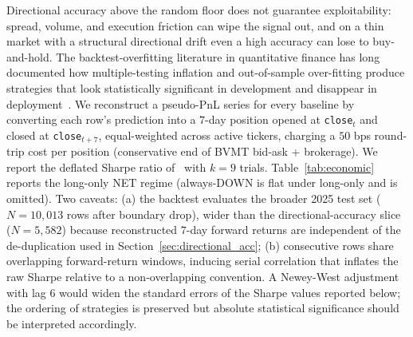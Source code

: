 \documentclass[conference]{IEEEtran}
\begin{document}
Directional accuracy above the random floor does not guarantee exploitability: spread, volume, and execution friction can wipe the signal out, and on a thin market with a structural directional drift even a high accuracy can lose to buy-and-hold. The backtest-overfitting literature in quantitative finance has long documented how multiple-testing inflation and out-of-sample over-fitting produce strategies that look statistically significant in development and disappear in deployment~\cite{ref:bailey_pseudo,ref:harvey_presidential}. We reconstruct a pseudo-PnL series for every baseline by converting each row's prediction into a $7$-day position opened at \texttt{close}$_t$ and closed at \texttt{close}$_{t+7}$, equal-weighted across active tickers, charging a $50$ bps round-trip cost per position (conservative end of BVMT bid-ask + brokerage). We report the deflated Sharpe ratio of~\cite{ref:deflated_sharpe} with $k\!=\!9$ trials. Table~\ref{tab:economic} reports the long-only NET regime (always-DOWN is flat under long-only and is omitted). Two caveats: (a) the backtest evaluates the broader 2025 test set ($N=10{,}013$ rows after boundary drop), wider than the directional-accuracy slice ($N=5{,}582$) because reconstructed $7$-day forward returns are independent of the de-duplication used in Section~\ref{sec:directional_acc}; (b) consecutive rows share overlapping forward-return windows, inducing serial correlation that inflates the raw Sharpe relative to a non-overlapping convention. A Newey-West adjustment with lag $6$ would widen the standard errors of the Sharpe values reported below; the ordering of strategies is preserved but absolute statistical significance should be interpreted accordingly.
\end{document}
